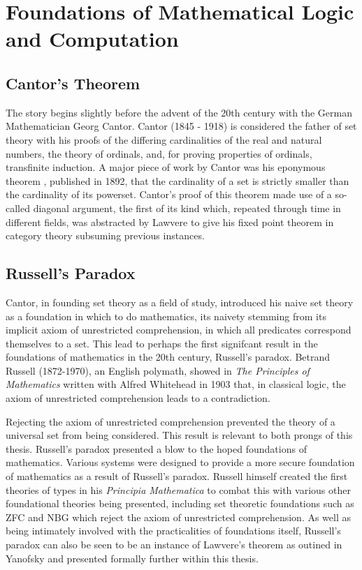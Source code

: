 \section{Foundations of Mathematical Logic and Computation}

\subsection{Cantor's Theorem}

The story begins slightly before the advent of the 20th century with the German
Mathematician Georg Cantor. Cantor (1845 - 1918) is considered the father of
set theory with his proofs of the differing cardinalities of the real and
natural numbers, the theory of ordinals, and, for proving properties of
ordinals, transfinite induction. A major piece of work by Cantor was his
eponymous theorem \cite{cantor1892ueber}, published in 1892,
that the cardinality of a set is strictly smaller than the cardinality of its
powerset. Cantor's proof of this theorem made use of a so-called diagonal
argument, the first of its kind which, repeated through time in different
fields, was abstracted by Lawvere to give his fixed point theorem in category
theory subsuming previous instances.

\subsection{Russell's Paradox}
Cantor, in founding set theory as a field of study, introduced his naive set
theory \cite{Cantor:1874} as a foundation in which to do mathematics, its
naivety stemming from its implicit axiom of unrestricted comprehension, in which
all predicates correspond themselves to a set. This lead to perhaps the first
signifcant result in the foundations of mathematics in the 20th century,
Russell's paradox. Betrand Russell (1872-1970), an English polymath, showed in
\textit{The Principles of Mathematics} written with Alfred Whitehead in 1903
that, in classical logic, the axiom of unrestricted comprehension leads to a
contradiction.


Rejecting the axiom of unrestricted comprehension prevented the theory of a
universal set from being considered.  This result is relevant to both prongs of
this thesis. Russell's paradox presented a blow to the hoped foundations of
mathematics. Various systems were designed to provide a more secure foundation
of mathematics as a result of Russell's paradox. Russell himself created the
first theories of types in his \textit{Principia Mathematica} \cite{russell25} to combat this
with various other foundational theories being presented, including set
theoretic foundations such as ZFC and NBG which reject the axiom of unrestricted
comprehension. As well as being intimately involved with the practicalities of
foundations itself, Russell's paradox can also be seen to be an instance of
Lawvere's theorem as outined in Yanofsky and presented formally further within
this thesis.

